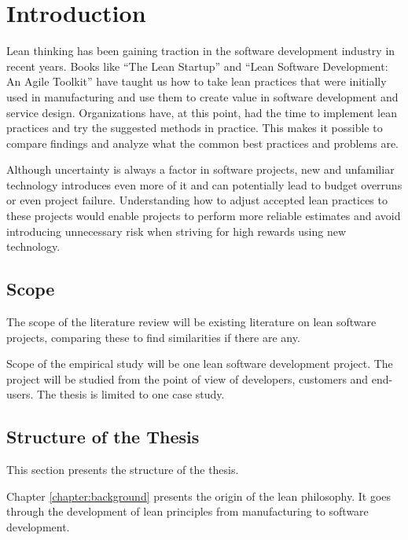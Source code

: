 

\chapter{Introduction}
\label{chapter:intro}

Lean thinking has been gaining traction in the software development industry in recent years. Books like ``The Lean Startup'' and ``Lean Software Development: An Agile Toolkit'' have taught us how to take lean practices that were initially used in manufacturing and use them to create value in software development and service design. Organizations have, at this point, had the time to implement lean practices and try the suggested methods in practice. This makes it possible to compare findings and analyze what the common best practices and problems are.

Although uncertainty is always a factor in software projects, new and unfamiliar technology introduces even more of it and can potentially lead to budget overruns or even project failure. Understanding how to adjust accepted lean practices to these projects would enable projects to perform more reliable estimates and avoid introducing unnecessary risk when striving for high rewards using new technology.

\section{Scope}
\label{section:scope}

The scope of the literature review will be existing literature on lean software projects, comparing these to find similarities if there are any.

Scope of the empirical study will be one lean software development project. The project will be studied from the point of view of developers, customers and end-users. The thesis is limited to one case study.

\section{Structure of the Thesis}
\label{section:structure}

This section presents the structure of the thesis.\\


Chapter \ref{chapter:background} presents the origin of the lean philosophy. It goes through the development of lean principles from manufacturing to software development.

